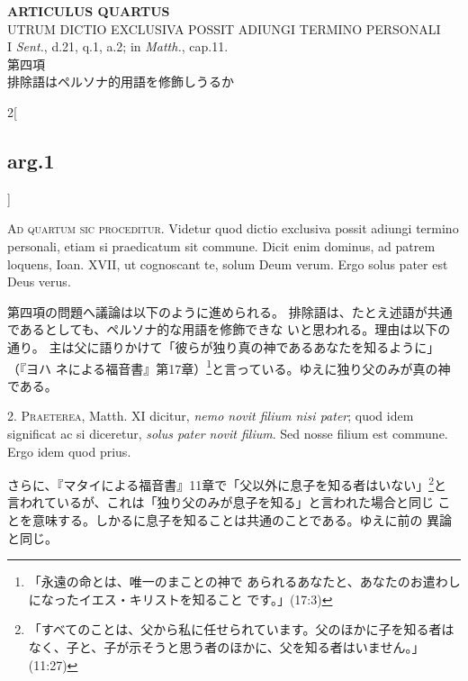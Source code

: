 \documentclass[paper=a4paper,fontsize=10pt,jafontsize=9pt,titlepage]{jlreq}
\begin{document}
\begin{center}
{\Large {\bfseries ARTICULUS QUARTUS}}\\
{\large UTRUM DICTIO EXCLUSIVA POSSIT ADIUNGI TERMINO PERSONALI}\\
{\footnotesize I {\itshape Sent.}, d.21, q.1, a.2; in {\itshape
 Matth.}, cap.11.}\\
{\Large 第四項\\排除語はペルソナ的用語を修飾しうるか}
\end{center}


{}
\setcounter{section}{4}
\setcounter{subsection}{0}

\begin{paracol}{2}[\subsection{arg.1}]

{\scshape Ad quartum sic proceditur}. Videtur quod dictio exclusiva possit
adiungi termino personali, etiam si praedicatum sit commune. Dicit
enim dominus, ad patrem loquens, Ioan. XVII, ut cognoscant te, solum
Deum verum. Ergo solus pater est Deus verus.

\switchcolumn

第四項の問題へ議論は以下のように進められる。
排除語は、たとえ述語が共通であるとしても、ペルソナ的な用語を修飾できな
 いと思われる。理由は以下の通り。
主は父に語りかけて「彼らが独り真の神であるあなたを知るように」（『ヨハ
 ネによる福音書』第17章）\footnote{「永遠の命とは、唯一のまことの神で
 あられるあなたと、あなたのお遣わしになったイエス・キリストを知ること
 です。」(17:3)}と言っている。ゆえに独り父のみが真の神である。


2. {\scshape Praeterea}, Matth. XI dicitur, {\itshape nemo novit filium nisi pater}; quod idem
significat ac si diceretur, {\itshape solus pater novit filium}. Sed nosse filium
est commune. Ergo idem quod prius.

\switchcolumn

さらに、『マタイによる福音書』11章で「父以外に息子を知る者はいない」\footnote{「すべてのことは、父から私に任せられています。父のほかに子を知る者はなく、子と、子が示そうと思う者のほかに、父を知る者はいません。」(11:27) }と
 言われているが、これは「独り父のみが息子を知る」と言われた場合と同じ
 ことを意味する。しかるに息子を知ることは共通のことである。ゆえに前の
 異論と同じ。


\end{paracol}
\end{document}
